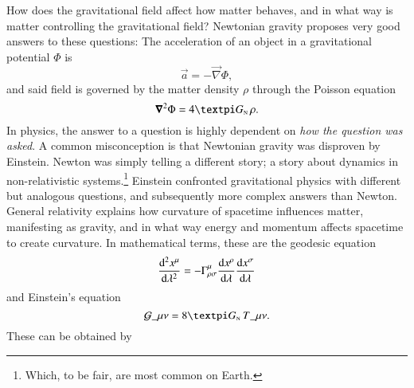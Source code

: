 










How does the gravitational field affect how matter behaves, and in what way is matter controlling the gravitational field? Newtonian gravity proposes very good answers to these questions: The acceleration of an object in a gravitational potential $\Phi$ is
\begin{equation}
    \vec{a} = -\vec{\nabla} \Phi,
\end{equation}
and said field is governed by the matter density $\rho$ through the Poisson equation
\begin{equation}
    \vec{\nabla}^2\Phi =  4 \ppi G\nped{N} \,\rho.
\end{equation}
In physics, the answer to a question is highly dependent on \emph{how the question was asked}. 
A common misconception is that Newtonian gravity was disproven by Einstein. Newton was simply telling a different story; a story about dynamics in non-relativistic systems.\footnote{Which, to be fair, are most common on Earth.} %
Einstein confronted gravitational physics with different but analogous questions, and subsequently more complex answers than Newton. General relativity explains how curvature of spacetime influences matter, manifesting as gravity, and in what way energy and momentum affects spacetime to create curvature. In mathematical terms, these are the geodesic equation 
\begin{equation}
    \dv[2]{x\^\mu}{\lambda} = - \Gamma\indices*{^\mu_{\rho\sigma}} \dv{x\^\rho}{\lambda} \dv{x\^\sigma}{\lambda} 
\end{equation}
and Einstein's equation
\begin{equation}
    \mathcal{G}\_{\mu\nu} = 8 \ppi G\nped{N} \, T\_{\mu\nu}.
\end{equation}
These can be obtained by 



